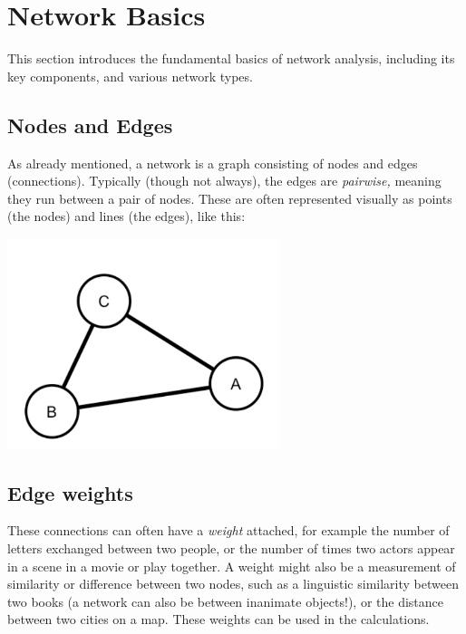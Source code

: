 \documentclass[
]{book}
\begin{document}
\hypertarget{network-basics}{%
\section{Network Basics}\label{network-basics}}

This section introduces the fundamental basics of network analysis, including its key components, and various network types.

\hypertarget{nodes-and-edges}{%
\subsection{Nodes and Edges}\label{nodes-and-edges}}

As already mentioned, a network is a graph consisting of nodes and edges (connections). Typically (though not always), the edges are \emph{pairwise,} meaning they run between a pair of nodes. These are often represented visually as points (the nodes) and lines (the edges), like this:

\includegraphics[width=3.125in,height=\textheight]{images/Screenshot 2022-09-26 at 11.42.32.png}

\hypertarget{edge-weights}{%
\subsection{Edge weights}\label{edge-weights}}

These connections can often have a \emph{weight} attached, for example the number of letters exchanged between two people, or the number of times two actors appear in a scene in a movie or play together. A weight might also be a measurement of similarity or difference between two nodes, such as a linguistic similarity between two books (a network can also be between inanimate objects!), or the distance between two cities on a map. These weights can be used in the calculations.
\end{document}
